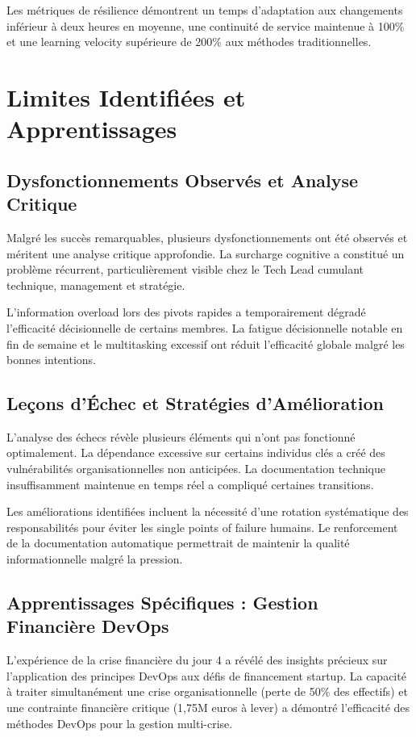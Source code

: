 \documentclass[12pt,a4paper]{article}
\begin{document}
Les métriques de résilience démontrent un temps d'adaptation aux changements inférieur à deux heures en moyenne, une continuité de service maintenue à 100\% et une learning velocity supérieure de 200\% aux méthodes traditionnelles.

\section{Limites Identifiées et Apprentissages}

\subsection{Dysfonctionnements Observés et Analyse Critique}

Malgré les succès remarquables, plusieurs dysfonctionnements ont été observés et méritent une analyse critique approfondie. La surcharge cognitive a constitué un problème récurrent, particulièrement visible chez le Tech Lead cumulant technique, management et stratégie.

L'information overload lors des pivots rapides a temporairement dégradé l'efficacité décisionnelle de certains membres. La fatigue décisionnelle notable en fin de semaine et le multitasking excessif ont réduit l'efficacité globale malgré les bonnes intentions.

\subsection{Leçons d'Échec et Stratégies d'Amélioration}

L'analyse des échecs révèle plusieurs éléments qui n'ont pas fonctionné optimalement. La dépendance excessive sur certains individus clés a créé des vulnérabilités organisationnelles non anticipées. La documentation technique insuffisamment maintenue en temps réel a compliqué certaines transitions.

Les améliorations identifiées incluent la nécessité d'une rotation systématique des responsabilités pour éviter les single points of failure humains. Le renforcement de la documentation automatique permettrait de maintenir la qualité informationnelle malgré la pression.

\subsection{Apprentissages Spécifiques : Gestion Financière DevOps}

L'expérience de la crise financière du jour 4 a révélé des insights précieux sur l'application des principes DevOps aux défis de financement startup. La capacité à traiter simultanément une crise organisationnelle (perte de 50\% des effectifs) et une contrainte financière critique (1,75M euros à lever) a démontré l'efficacité des méthodes DevOps pour la gestion multi-crise.
\end{document}
